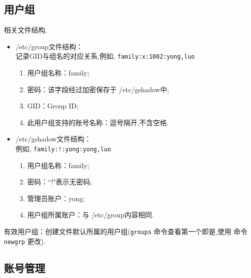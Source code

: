\subsection{用户组}
相关文件结构,
\begin{itemize}
    \item /etc/group文件结构：\\
    记录GID与组名的对应关系,例如, \verb|family:x:1002:yong,luo|
    \begin{enumerate}
        \item 用户组名称：family;
        \item 密码：该字段经过加密保存于 /etc/gshadow中;
        \item GID：Group ID;
        \item 此用户组支持的账号名称：逗号隔开,不含空格.
    \end{enumerate}

    \item /etc/gshadow文件结构：\\
    例如, \verb|family:!:yong:yong,luo|
    \begin{enumerate}
        \item 用户组名称：family;
        \item 密码：``!"表示无密码;
        \item 管理员账户：yong;
        \item 用户组所属账户：与 /etc/group内容相同.
    \end{enumerate}
\end{itemize}

有效用户组：创建文件默认所属的用户组(\texttt{groups} 命令查看第一个即是,使用%
命令\texttt{newgrp} 更改).

\subsection{账号管理}
